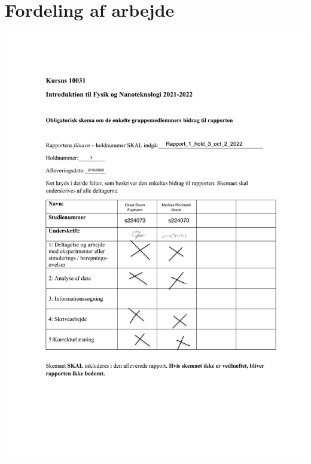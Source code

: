 \documentclass[a4paper,twoside]{article}
\begin{document}
\section{Fordeling af arbejde}
\includegraphics{Bidragsskema_2022}
\end{document}
